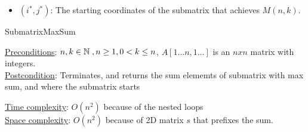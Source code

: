 \begin{customsolutionbox}
\begin{itemize}
        
            \item $(i^*, j^*)$: The starting coordinates of the submatrix that achieves $M(n, k)$.
        \end{itemize}
        

    \begin{algorithm}[H]
        \caption{SubmatrixMaxSum}
        \underline{Preconditions}: $n, k \in \mathbb{N}\hspace{1.0mm}, n \geq 1, 0<k\leq n$, $A[1\ldots n, 1 \ldots]$ is an $n x n$ matrix 
        with integers.\\
        \underline{Postcondition}: Terminates, and returns the sum elememts of submatrix with max sum, and where the 
        submatrix starts \\
    \end{algorithm}

    \underline{Time complexity}: $O(n^2)$ because of the nested loops \\
    \underline{Space complexity}: $O(n^2)$ because of 2D matrix $s$ that prefixes the sum.
\end{customsolutionbox}